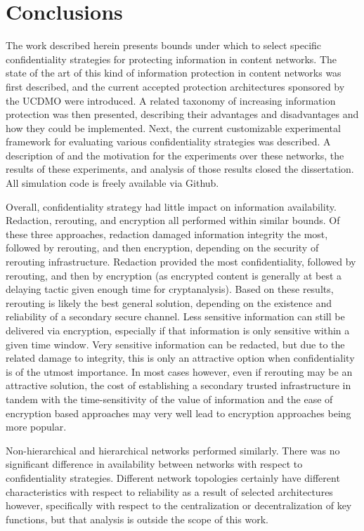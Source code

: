 \section{Conclusions}
The work described herein presents bounds under which to select specific confidentiality strategies for protecting information in content networks.  The state of the art of this kind of information protection in content networks was first described, and the current accepted protection architectures sponsored by the UCDMO were introduced.  A related taxonomy of increasing information protection was then presented, describing their advantages and disadvantages and how they could be implemented.  Next, the current customizable experimental framework for evaluating various confidentiality strategies was described.  A description of and the motivation for the experiments over these networks, the results of these experiments, and analysis of those results closed the dissertation.  All simulation code is freely available via Github.

Overall, confidentiality strategy had little impact on information availability.  Redaction, rerouting, and encryption all performed within similar bounds.  Of these three approaches, redaction damaged information integrity the most, followed by rerouting, and then encryption, depending on the security of rerouting infrastructure.  Redaction provided the most confidentiality, followed by rerouting, and then by encryption (as encrypted content is generally at best a delaying tactic given enough time for cryptanalysis).  Based on these results, rerouting is likely the best general solution, depending on the existence and reliability of a secondary secure channel.  Less sensitive information can still be delivered via encryption, especially if that information is only sensitive within a given time window.  Very sensitive information can be redacted, but due to the related damage to integrity, this is only an attractive option when confidentiality is of the utmost importance.  In most cases however, even if rerouting may be an attractive solution, the cost of establishing a secondary trusted infrastructure in tandem with the time-sensitivity of the value of information and the ease of encryption based approaches may very well lead to encryption approaches being more popular. 
	
Non-hierarchical and hierarchical networks performed similarly.  There was no significant difference in availability between networks with respect to confidentiality strategies.  Different network topologies certainly have different characteristics with respect to reliability as a result of selected architectures however, specifically with respect to the centralization or decentralization of key functions, but that analysis is outside the scope of this work.
	
